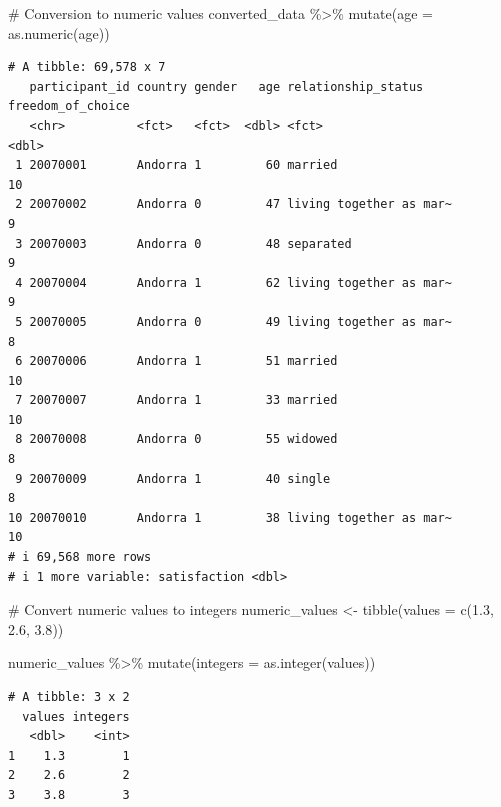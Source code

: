 \documentclass[
  letterpaper,
]{krantz}
\makeatletter
\newenvironment{Shaded}{\begin{snugshade}}{\end{snugshade}}
\newcommand{\AttributeTok}[1]{\textcolor[rgb]{0.40,0.45,0.13}{#1}}
\newcommand{\CommentTok}[1]{\textcolor[rgb]{0.37,0.37,0.37}{#1}}
\newcommand{\FloatTok}[1]{\textcolor[rgb]{0.68,0.00,0.00}{#1}}
\newcommand{\FunctionTok}[1]{\textcolor[rgb]{0.28,0.35,0.67}{#1}}
\newcommand{\NormalTok}[1]{\textcolor[rgb]{0.00,0.23,0.31}{#1}}
\newcommand{\OtherTok}[1]{\textcolor[rgb]{0.00,0.23,0.31}{#1}}
\newcommand{\SpecialCharTok}[1]{\textcolor[rgb]{0.37,0.37,0.37}{#1}}
\newenvironment{kframe}{%
\medskip{}
\setlength{\fboxsep}{.8em}
 \def\at@end@of@kframe{}%
 \ifinner\ifhmode%
  \def\at@end@of@kframe{\end{minipage}}%
  \begin{minipage}{\columnwidth}%
 \fi\fi%
 \def\FrameCommand##1{\hskip\@totalleftmargin \hskip-\fboxsep
 \colorbox{shadecolor}{##1}\hskip-\fboxsep
     \hskip-\linewidth \hskip-\@totalleftmargin \hskip\columnwidth}%
 \MakeFramed {\advance\hsize-\width
   \@totalleftmargin\z@ \linewidth\hsize
   \@setminipage}}%
 {\par\unskip\endMakeFramed%
 \at@end@of@kframe}
\renewenvironment{Shaded}{\begin{kframe}}{\end{kframe}}
\makeatother
\begin{document}
\begin{Shaded}
\begin{Highlighting}[]
\CommentTok{\# Conversion to numeric values}
\NormalTok{converted\_data }\SpecialCharTok{\%\textgreater{}\%}
  \FunctionTok{mutate}\NormalTok{(}\AttributeTok{age =} \FunctionTok{as.numeric}\NormalTok{(age))}
\end{Highlighting}
\end{Shaded}

\begin{verbatim}
# A tibble: 69,578 x 7
   participant_id country gender   age relationship_status     freedom_of_choice
   <chr>          <fct>   <fct>  <dbl> <fct>                               <dbl>
 1 20070001       Andorra 1         60 married                                10
 2 20070002       Andorra 0         47 living together as mar~                 9
 3 20070003       Andorra 0         48 separated                               9
 4 20070004       Andorra 1         62 living together as mar~                 9
 5 20070005       Andorra 0         49 living together as mar~                 8
 6 20070006       Andorra 1         51 married                                10
 7 20070007       Andorra 1         33 married                                10
 8 20070008       Andorra 0         55 widowed                                 8
 9 20070009       Andorra 1         40 single                                  8
10 20070010       Andorra 1         38 living together as mar~                10
# i 69,568 more rows
# i 1 more variable: satisfaction <dbl>
\end{verbatim}

\begin{Shaded}
\begin{Highlighting}[]
\CommentTok{\# Convert numeric values to integers}
\NormalTok{numeric\_values }\OtherTok{\textless{}{-}} \FunctionTok{tibble}\NormalTok{(}\AttributeTok{values =} \FunctionTok{c}\NormalTok{(}\FloatTok{1.3}\NormalTok{, }\FloatTok{2.6}\NormalTok{, }\FloatTok{3.8}\NormalTok{))}

\NormalTok{numeric\_values }\SpecialCharTok{\%\textgreater{}\%}
  \FunctionTok{mutate}\NormalTok{(}\AttributeTok{integers =} \FunctionTok{as.integer}\NormalTok{(values))}
\end{Highlighting}
\end{Shaded}

\begin{verbatim}
# A tibble: 3 x 2
  values integers
   <dbl>    <int>
1    1.3        1
2    2.6        2
3    3.8        3
\end{verbatim}
\end{document}
